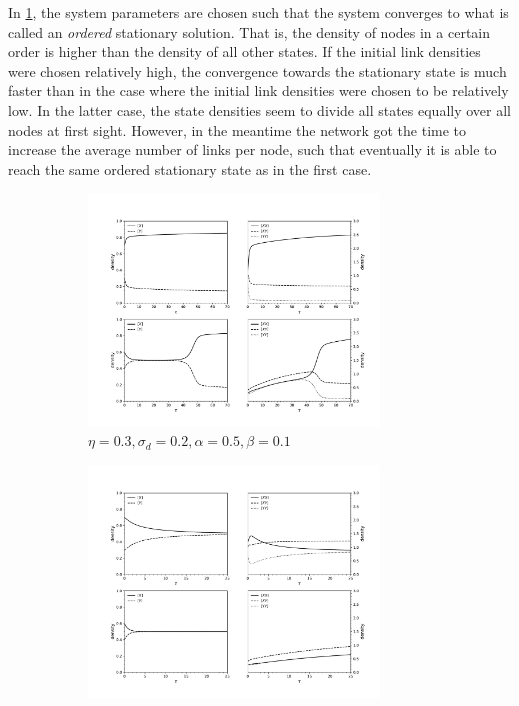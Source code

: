In \cref{fig:typical_behaviour1}, the system parameters are chosen such that the system converges to what is called an \textit{ordered} stationary solution. That is, the density of nodes in a certain order is higher than the density of all other states. If the initial link densities were chosen relatively high, the convergence towards the stationary state is much faster than in the case where the initial link densities were chosen to be relatively low. In the latter case, the state densities seem to divide all states equally over all nodes at first sight. However, in the meantime the network got the time to increase the average number of links per node, such that eventually it is able to reach the same ordered stationary state as in the first case. 

\begin{figure}[htp]
	\centering
	\begin{subfigure}{\textwidth}
		\centering
		\includegraphics[width = 0.85\textwidth, trim={0 0.5cm 0 2cm},clip=true]{figures/discrete_double_run_1} %
		\caption{$\eta = 0.3, \sigma_d = 0.2, \alpha = 0.5, \beta = 0.1$}
		\label{fig:typical_behaviour1}
	\end{subfigure}
	\begin{subfigure}{\textwidth}
		\centering
		\includegraphics[width = 0.85\textwidth, trim={0 0.5cm 0 1cm},clip=true]{figures/discrete_double_run_2}

\end{subfigure}
\end{figure}
